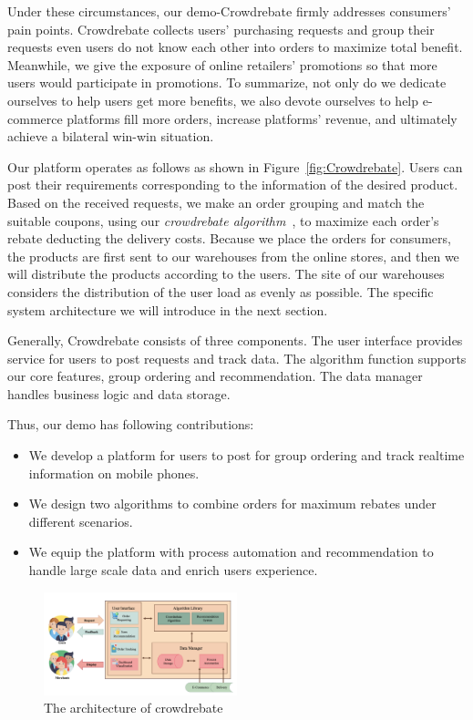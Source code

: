 Under these circumstances, our demo-Crowdrebate firmly addresses consumers' pain points. Crowdrebate collects users' purchasing requests and group their requests even users do not know each other into orders to maximize total benefit. Meanwhile, we give the exposure of online retailers' promotions so that more users would participate in promotions. To summarize, not only do we dedicate ourselves to help users get more benefits, we also devote ourselves to help e-commerce platforms fill more orders, increase platforms’ revenue, and ultimately achieve a bilateral win-win situation.

Our platform operates as follows as shown in Figure~\ref{fig:Crowdrebate}. Users can post their requirements corresponding to the information of the desired product. Based on the received requests, we make an order grouping and match the suitable coupons, using our \emph{crowdrebate algorithm}~\cite{Report}, to maximize each order's rebate deducting the delivery costs. Because we place the orders for consumers, the products are first sent to our warehouses from the online stores, and then we will distribute the products according to the users. The site of our warehouses considers the distribution of the user load as evenly as possible. The specific system architecture we will introduce in the next section.

Generally, Crowdrebate consists of three components. The user interface provides service for users to post requests and track data. The algorithm function supports our core features, group ordering and recommendation. The data manager handles business logic and data storage.

Thus, our demo has following contributions:
\begin{itemize}
	\item We develop a platform for users to post for group ordering and track realtime information on mobile phones.
	\item We design two algorithms to combine orders for maximum rebates under different scenarios.
	\item We equip the platform with process automation and recommendation to handle large scale data and enrich users experience.
\end{itemize}
\begin{figure}[t] \vspace{-2ex}
	\centering %
	\includegraphics[width=0.5\textwidth]{../figure/ar.png} %
	\caption{The architecture of crowdrebate} %
	\label{fig:ar} %
	\vspace{-3ex}
\end{figure}

